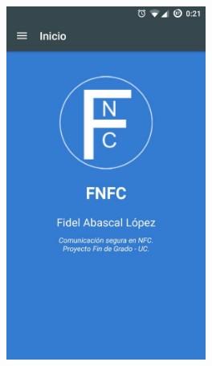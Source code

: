 \documentclass[../PFC.tex]{subfiles}
\begin{document}

\begin{figure}[H]
\centering
	\begin{subfigure}{0.4\textwidth}
		\centering
		\includegraphics[width=0.72\textwidth]{./img/pantallaPrincipal}
    \end{subfigure}          
    \qquad\qquad\qquad  %
    \begin{subfigure}{0.4\textwidth}  
       \centering

\end{subfigure}
\end{figure}
\end{document}
